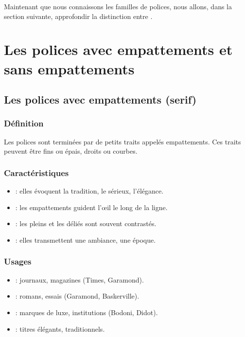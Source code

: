 Maintenant que nous connaissons les familles de polices, nous allons, dans la section suivante, approfondir la distinction entre .

\section{Les polices avec empattements et sans empattements}

\subsection{Les polices avec empattements (serif)}

\subsubsection{Définition}

Les polices  sont terminées par de petits traits appelés empattements. Ces traits peuvent être fins ou épais, droits ou courbes.

\subsubsection{Caractéristiques}

\begin{itemize}
    \item {} : elles évoquent la tradition, le sérieux, l'élégance.
    \item {} : les empattements guident l'œil le long de la ligne.
    \item {} : les pleins et les déliés sont souvent contrastés.
    \item {} : elles transmettent une ambiance, une époque.
\end{itemize}

\subsubsection{Usages}

\begin{itemize}
    \item {} : journaux, magazines (Times, Garamond).
    \item {} : romans, essais (Garamond, Baskerville).
    \item {} : marques de luxe, institutions (Bodoni, Didot).
    \item {} : titres élégants, traditionnels.
\end{itemize}

